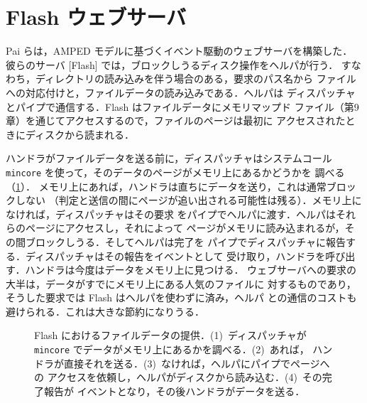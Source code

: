 \documentclass[../main.tex]{subfiles}
\begin{document}
\section{Flash ウェブサーバ}
\label{sec:l06-flash}

Pai らは，AMPED モデルに基づくイベント駆動のウェブサーバを構築した．
彼らのサーバ
[Flash] では，ブロックしうるディスク操作をヘルパが行う．
すなわち，ディレクトリの読み込みを伴う場合のある，要求のパス名から
ファイルへの対応付けと，ファイルデータの読み込みである．ヘルパは
ディスパッチャとパイプで通信する．Flash はファイルデータにメモリマップド
ファイル（第9章）を通じてアクセスするので，ファイルのページは最初に
アクセスされたときにディスクから読まれる．

ハンドラがファイルデータを送る前に，ディスパッチャはシステムコール
\texttt{mincore} を使って，そのデータのページがメモリ上にあるかどうかを
調べる（\cref{fig:l06-flash}）．%
%
メモリ上にあれば，ハンドラは直ちにデータを送り，これは通常ブロックしない
（判定と送信の間にページが追い出される可能性は残る）．メモリ上になければ，ディスパッチャはその要求
をパイプでヘルパに渡す．ヘルパはそれらのページにアクセスし，それによって
ページがメモリに読み込まれるが，その間ブロックしうる．そしてヘルパは完了を
パイプでディスパッチャに報告する．ディスパッチャはその報告をイベントとして
受け取り，ハンドラを呼び出す．ハンドラは今度はデータをメモリ上に見つける．
ウェブサーバへの要求の大半は，データがすでにメモリ上にある人気のファイルに
対するものであり，そうした要求では Flash はヘルパを使わずに済み，ヘルパ
との通信のコストも避けられる．これは大きな節約になりうる．

\begin{figure}[htbp]
  \centering
  
  \caption{Flash におけるファイルデータの提供．(1)~ディスパッチャが
    \texttt{mincore} でデータがメモリ上にあるかを調べる．(2)~あれば，
    ハンドラが直接それを送る．(3)~なければ，ヘルパにパイプでページへの
    アクセスを依頼し，ヘルパがディスクから読み込む．(4)~その完了報告が
    イベントとなり，その後ハンドラがデータを送る．}
  \label{fig:l06-flash}
\end{figure}
\end{document}
